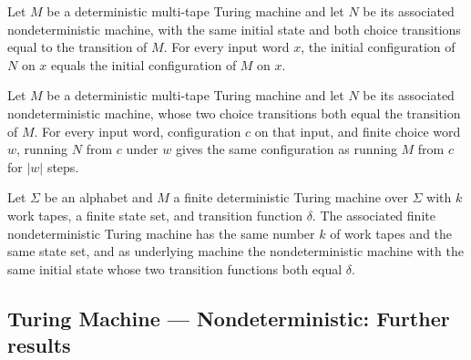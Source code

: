 \begin{lemma}
\label{Turing.MultiTapeTM.toNDTM_initCfg}
\leanok
{}
Let $M$ be a deterministic multi-tape Turing machine and let $N$ be its associated
nondeterministic machine, with the same initial state and both choice transitions equal
to the transition of $M$. For every input word $x$, the initial configuration of $N$ on
$x$ equals the initial configuration of $M$ on $x$.
\end{lemma}

\begin{theorem}
\label{Turing.MultiTapeTM.toNDTM_runWith}
\leanok
{}
Let $M$ be a deterministic multi-tape Turing machine and let $N$ be its associated
nondeterministic machine, whose two choice transitions both equal the transition of $M$.
For every input word, configuration $c$ on that input, and finite choice word $w$,
running $N$ from $c$ under $w$ gives the same configuration as running $M$ from $c$ for
$|w|$ steps.
\end{theorem}

\begin{definition}
\label{Turing.FinTM.toFinNDTM}
\leanok
{}
Let $\Sigma$ be an alphabet and $M$ a finite deterministic Turing machine over $\Sigma$ with
$k$ work tapes, a finite state set, and transition function $\delta$.  The associated finite
nondeterministic Turing machine has the same number $k$ of work tapes and the same state
set, and as underlying machine the nondeterministic machine with the same initial state
whose two transition functions both equal $\delta$.
\end{definition}

\subsection*{Turing Machine --- Nondeterministic: Further results}


